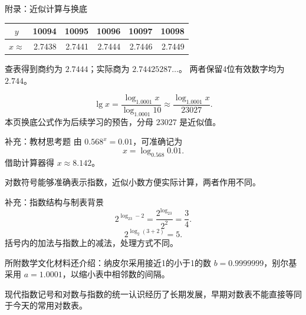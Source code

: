 \begin{frame}[t]{附录：近似计算与换底}
\small\centering\begin{tabular}{c|rrrrr}
$y$&10094&10095&10096&10097&10098\\\hline
$x\approx$&2.7438&2.7441&2.7444&2.7446&2.7449
\end{tabular}\par\normalsize
查表得到商约为 $2.7444$；实际商为 $2.74425287\ldots$。
两者保留4位有效数字均为 $2.744$。

\[\lg x=\frac{\log_{1.0001}x}{\log_{1.0001}10}
\approx\frac{\log_{1.0001}x}{23027}.\]
本页换底公式作为后续学习的预告，分母 $23027$ 是近似值。\end{frame}

\begin{frame}[t]{补充：教材思考题}
由 $0.568^x=0.01$，可准确记为
\[x=\log_{0.568}0.01.\]
借助计算器得 $x\approx8.142$。

对数符号能够准确表示指数，近似小数方便实际计算，两者作用不同。\end{frame}
\begin{frame}[t]{补充：指数结构与制表背景}
\[2^{\log_23-2}=\frac{2^{\log_23}}{2^2}=\frac34.\]
\[2^{\log_2(3+2)}=5.\]
括号内的加法与指数上的减法，处理方式不同。

所附数学文化材料还介绍：纳皮尔采用接近1的小于1的数
$b=0.9999999$，别尔基采用 $a=1.0001$，以缩小表中相邻数的间隔。

现代指数记号和对数与指数的统一认识经历了长期发展，早期对数表不能直接等同于今天的常用对数表。
\end{frame}
